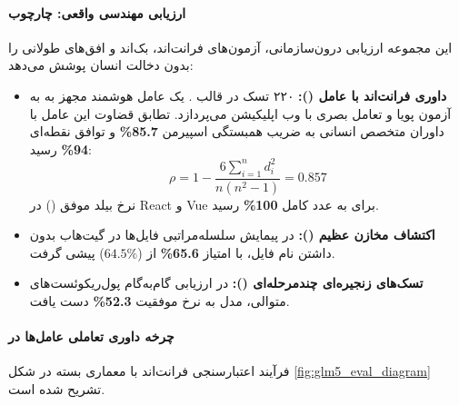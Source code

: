 \paragraph*{ارزیابی مهندسی واقعی: چارچوب }
این مجموعه ارزیابی درون‌سازمانی، آزمون‌های فرانت‌اند، بک‌اند و افق‌های طولانی را بدون دخالت انسان پوشش می‌دهد:
\begin{itemize}
    \item \textbf{داوری فرانت‌اند با عامل ():} ۲۲۰ تسک در قالب . یک عامل هوشمند مجهز به  به آزمون پویا و تعامل بصری با وب اپلیکیشن می‌پردازد. تطابق قضاوت این عامل با داوران متخصص انسانی به ضریب همبستگی اسپیرمن \textbf{85.7\%} و توافق نقطه‌ای \textbf{94\%} رسید:
    \begin{equation}
        \rho = 1 - \frac{6 \sum_{i=1}^n d_i^2}{n(n^2 - 1)} = 0.857
    \end{equation}
    نرخ بیلد موفق () در React و Vue برای  به عدد کامل \textbf{100\%} رسید.
    \item \textbf{اکتشاف مخازن عظیم ():} در پیمایش سلسله‌مراتبی فایل‌ها در گیت‌هاب بدون داشتن نام فایل،  با امتیاز \textbf{65.6\%} از  ($64.5\%$) پیشی گرفت.
    \item \textbf{تسک‌های زنجیره‌ای چندمرحله‌ای ():} در ارزیابی گام‌به‌گام پول‌ریکوئست‌های متوالی، مدل به نرخ موفقیت \textbf{52.3\%} دست یافت.
\end{itemize}

\paragraph*{چرخه داوری تعاملی عامل‌ها در }
فرآیند اعتبارسنجی فرانت‌اند با معماری بسته در شکل \ref{fig:glm5_eval_diagram} تشریح شده است.

